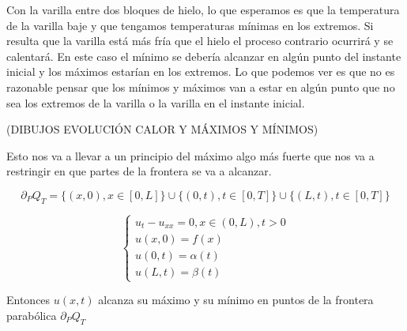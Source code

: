 	 Con la varilla entre dos bloques de hielo, lo que esperamos es que la temperatura de la varilla baje y que tengamos temperaturas mínimas en los extremos. Si resulta que la varilla está más fría que el hielo el proceso contrario ocurrirá y se calentará. En este caso el mínimo se debería alcanzar en algún punto del instante inicial y los máximos estarían en los extremos. Lo que podemos ver es que no es razonable pensar que los mínimos y máximos van a estar en algún punto que no sea los extremos de la varilla o la varilla en el instante inicial.

	 (DIBUJOS EVOLUCIÓN CALOR Y MÁXIMOS Y MÍNIMOS)

	 Esto nos va a llevar a un principio del máximo algo más fuerte que nos va a restringir en que partes de la frontera se va a alcanzar.

	 \begin{defn}
	 	\[\partial_P Q_T = \{(x,0), x \in [0,L]\} \cup \{(0,t), t \in [0,T]\} \cup \{(L,t), t \in [0,T]\}\]
	 \end{defn}

	 \begin{theorem}
	 	\[ \begin{cases}
	 		u_{t} - u_{xx} = 0, x \in (0,L), t > 0 \\
			u(x,0) = f(x) \\
			u(0,t) = \alpha(t) \\
			u(L,t) = \beta(t)
	 	\end{cases}\]

	 	Entonces $u(x,t)$ alcanza su máximo y su mínimo en puntos de la frontera parabólica $\partial_P Q_T$
	 \end{theorem}

